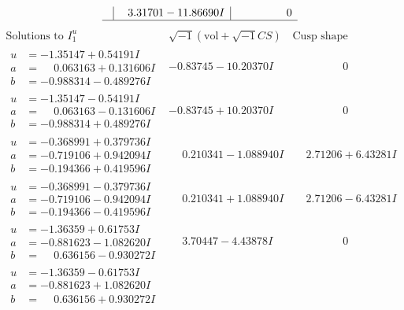 \documentclass[1p]{elsarticle_modified}
\theoremstyle{definition}
\newcommand{\I}{\sqrt{-1}}
\begin{document}
$$\begin{array}{c|c|c}
 & \phantom{-}3.31701 - 11.86690 I & \phantom{-0.000000 } 0\\
 \hline 
 \end{array}$$\newpage$$\begin{array}{c|c|c}  
\text{Solutions to }I^u_{1}& \I (\text{vol} + \sqrt{-1}CS) & \text{Cusp shape}\\
 \hline 
\begin{aligned}
u &= -1.35147 + 0.54191 I \\
a &= \phantom{-}0.063163 + 0.131606 I \\
b &= -0.988314 - 0.489276 I\end{aligned}
 & -0.83745 - 10.20370 I & \phantom{-0.000000 } 0 \\ \hline\begin{aligned}
u &= -1.35147 - 0.54191 I \\
a &= \phantom{-}0.063163 - 0.131606 I \\
b &= -0.988314 + 0.489276 I\end{aligned}
 & -0.83745 + 10.20370 I & \phantom{-0.000000 } 0 \\ \hline\begin{aligned}
u &= -0.368991 + 0.379736 I \\
a &= -0.719106 + 0.942094 I \\
b &= -0.194366 + 0.419596 I\end{aligned}
 & \phantom{-}0.210341 - 1.088940 I & \phantom{-}2.71206 + 6.43281 I \\ \hline\begin{aligned}
u &= -0.368991 - 0.379736 I \\
a &= -0.719106 - 0.942094 I \\
b &= -0.194366 - 0.419596 I\end{aligned}
 & \phantom{-}0.210341 + 1.088940 I & \phantom{-}2.71206 - 6.43281 I \\ \hline\begin{aligned}
u &= -1.36359 + 0.61753 I \\
a &= -0.881623 - 1.082620 I \\
b &= \phantom{-}0.636156 - 0.930272 I\end{aligned}
 & \phantom{-}3.70447 - 4.43878 I & \phantom{-0.000000 } 0 \\ \hline\begin{aligned}
u &= -1.36359 - 0.61753 I \\
a &= -0.881623 + 1.082620 I \\
b &= \phantom{-}0.636156 + 0.930272 I\end{aligned}

\end{array}$$
\end{document}
